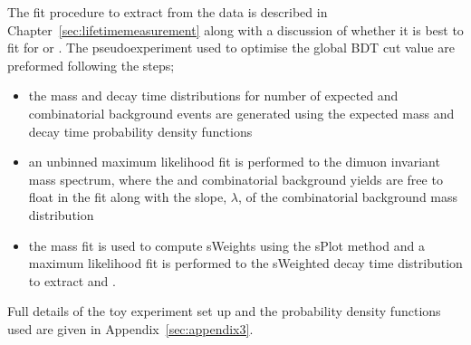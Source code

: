 The fit procedure to extract \tmumu from the data is described in Chapter~\ref{sec:lifetimemeasurement} along with a discussion of whether it is best to fit for \tmumu or \invtmumu. The pseudoexperiment used to optimise the global BDT cut value are preformed following the steps;
\begin{itemize}
\item the mass and decay time distributions for number of expected \bsmumu and combinatorial background events are generated using the expected mass and decay time probability density functions
\item an unbinned maximum likelihood fit is performed to the dimuon invariant mass spectrum, where the \bsmumu and combinatorial background yields are free to float in the fit along with the slope, $\lambda$, of the combinatorial background mass distribution
\item the mass fit is used to compute sWeights using the sPlot method \cite{Pivk:2004ty} and a maximum likelihood fit is performed to the sWeighted decay time distribution to extract \tmumu and \invtmumu. 
\end{itemize}
Full details of the toy experiment set up and the probability density functions used are given in Appendix~\ref{sec:appendix3}. 

